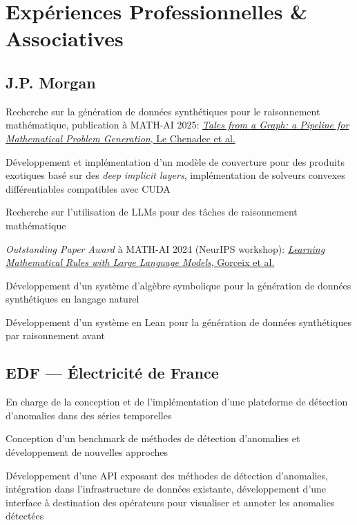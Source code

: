\section{Expériences Professionnelles \& Associatives}

\subsection{{J.P. Morgan}}
\begin{leftbar}
    \begin{zitemize}
        \item Recherche sur la génération de données synthétiques pour le raisonnement mathématique, publication à MATH-AI 2025:
        \href{https://openreview.net/forum?id=fqtdnjcHTp}{\textit{Tales from a Graph: a Pipeline for Mathematical Problem Generation}, Le Chenadec et al.}
        \item Développement et implémentation d'un modèle de couverture pour des produits exotiques basé sur des \textit{deep implicit layers}, implémentation de solveurs convexes différentiables compatibles avec CUDA
    \end{zitemize}
    \begin{zitemize}
        \item Recherche sur l'utilisation de LLMs pour des tâches de raisonnement mathématique
        \item \textit{Outstanding Paper Award} à MATH-AI 2024 (NeurIPS workshop):
        \href{https://arxiv.org/abs/2410.16973}{\textit{Learning Mathematical Rules with Large Language Models}, Gorceix et al.}
        \item Développement d'un système d'algèbre symbolique pour la génération de données synthétiques en langage naturel
        \item Développement d'un système en Lean pour la génération de données synthétiques par raisonnement avant
    \end{zitemize}
\end{leftbar}
\subsection{{EDF --- Électricité de France}}
\begin{leftbar}
    \begin{zitemize}
        \item En charge de la conception et de l'implémentation d'une plateforme de détection d'anomalies dans des séries temporelles
        \item Conception d'un benchmark de méthodes de détection d'anomalies et développement de nouvelles approches
        \item Développement d'une API exposant des méthodes de détection d'anomalies, intégration dans l'infrastructure de données existante, développement d'une interface à destination des opérateurs pour visualiser et annoter les anomalies détectées
    \end{zitemize}
\end{leftbar}
